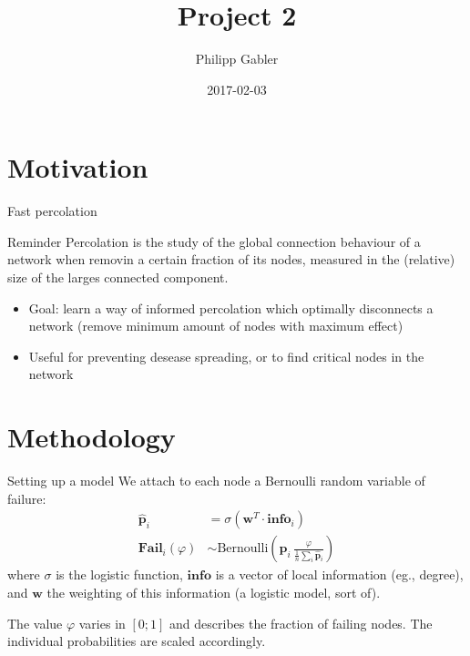 \documentclass{beamer}
\author{Philipp Gabler}
\title{Project 2}
\date{2017-02-03}
\begin{document}
\beamertemplatenavigationsymbolsempty

\section{Motivation}
\begin{frame}{Fast percolation}
  \begin{block}{Reminder}
    Percolation is the study of the global connection behaviour of a network when removin a certain
    fraction of its nodes, measured in the (relative) size of the larges connected component.
  \end{block}
  
  \begin{itemize}
  \item Goal: learn a way of informed percolation which optimally disconnects a network (remove
    minimum amount of nodes with maximum effect)
  \item Useful for preventing desease spreading, or to find critical nodes in the network
  \end{itemize}
\end{frame}


\section{Methodology}
\begin{frame}{Setting up a model}
We attach to each node a Bernoulli random variable of failure:
\begin{align*}
  \hat{\mathbf{p}}_i &= \sigma(\mathbf{w}^T \cdot \mathbf{info}_i) \\
  \mathbf{Fail}_i(\varphi) &\sim \text{Bernoulli}\left(\hat{\mathbf{p}}_i\,
                      \frac{\varphi}{\frac{1}{n}\sum_i \hat{\mathbf{p}}_i}\right)
\end{align*}
where \(\sigma\) is the logistic function, \(\mathbf{info}\) is a vector of local information (eg.,
degree), and \(\mathbf{w}\) the weighting of this information (a logistic model, sort of).

The value \(\varphi\) varies in \([0; 1]\) and describes the fraction of failing nodes.  The
individual probabilities are scaled accordingly.
\end{frame}



\end{document}

